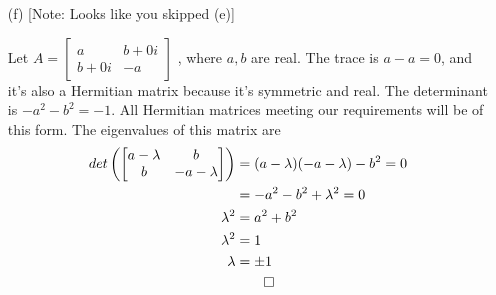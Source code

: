 \documentclass[12pt]{article}
\begin{document}
\begin{enumerate}[(a)]
	\item [(f)] [Note: Looks like you skipped (e)]\par
		Let 
		$ A = \begin{bmatrix}
			a & b+0i\\
			b+0i & -a
		\end{bmatrix} $
		, where $ a,b $ are real. 
		The trace is $ a-a=0 $, and it's also a Hermitian matrix because it's symmetric and real. 
		The determinant is $ -a^2 -b^2 =-1$. 
		All Hermitian matrices meeting our requirements will be of this form. 
		The eigenvalues of this matrix are 
		\begin{align*}
			det\left(
				\begin{bmatrix}
					a-\lambda & b\\
					b & -a-\lambda
				\end{bmatrix}
				\right) &= (a-\lambda)(-a-\lambda)-b^2 = 0 \\
			&=  -a^2-b^2+\lambda^2 = 0\\
			\lambda^2 &= a^2+b^2\\
			\lambda^2 &= 1\\
			\lambda &= \pm 1\\
			&\qed
		\end{align*}

		
		
\end{enumerate}
\end{document}
